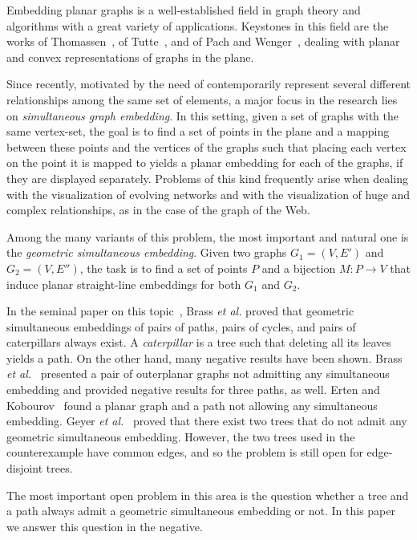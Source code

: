 \documentclass[a4paper,10pt]{llncs}
\begin{document}
Embedding planar graphs is a well-established field in graph theory and algorithms with a great variety of applications. Keystones in this field are the works of Thomassen~\cite{t-eg-94}, of Tutte~\cite{t-hdg-63}, and of Pach and Wenger~\cite{pw-epgfvl-01}, dealing with planar and convex representations of graphs in the plane.

Since recently, motivated by the need of contemporarily represent several different relationships among the same set of elements, a major focus in the research lies on \emph{simultaneous graph embedding}. In this setting, given a set of graphs with the same vertex-set, the goal is to find a set of points in the plane and a mapping between these points and the vertices of the graphs such that placing each vertex on the point it is mapped to yields a planar embedding for each of the graphs, if they are displayed separately. Problems of this kind frequently arise when dealing with the visualization of evolving networks and with the visualization of huge and complex relationships, as in the case of the graph of the Web.

Among the many variants of this problem, the most important and natural one is the \emph{geometric simultaneous embedding}. Given two graphs $G_1=(V,E')$ and $G_2=(V,E'')$, the task is to find a set of points $P$ and a bijection $M: P \rightarrow V$ that induce planar straight-line embeddings for both $G_1$ and $G_2$.

In the seminal paper on this topic~\cite{J-bcdeeiklm-spge-07}, Brass \emph{et al.} proved that geometric simultaneous embeddings of pairs of paths, pairs of cycles, and pairs of caterpillars always exist. A \emph{caterpillar} is a tree such that deleting all its leaves yields a path. On the other hand, many negative results have been shown. Brass \emph{et al.}~\cite{J-bcdeeiklm-spge-07} presented a pair of outerplanar graphs not admitting any simultaneous embedding and provided negative results for three paths, as well. Erten and Kobourov~\cite{ek-sepgfb-04} found a planar graph and a path not allowing any simultaneous embedding. Geyer \emph{et al.}~\cite{gkv-ttsids-09} proved that there exist two trees that do not admit any geometric simultaneous embedding. However, the two trees used in the counterexample have common edges, and so the problem is still open for edge-disjoint trees.

The most important open problem in this area is the question whether a tree and a path always admit a geometric simultaneous embedding or not. In this paper we answer this question in the negative.
\end{document}
